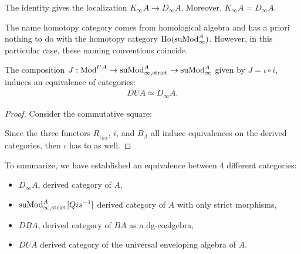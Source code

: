\documentclass[../thesis.tex]{subfiles}
\begin{document}
            \begin{corollary}
                The identity gives the localization $K_\infty A \to D_\infty A$. Moreover, $K_\infty A = D_\infty A$.
            \end{corollary}

            \begin{remark}
                The name homotopy category comes from homological algebra and has a priori nothing to do with the homotopy category $\tt{Ho}(\tt{suMod}_\infty^A)$. However, in this particular case, these naming conventions coincide.
            \end{remark}

            \begin{lemma}\label{lem: universal-enveloping-is-derived}
                The composition $J : \tt{Mod}^{UA} \to \tt{suMod}_{\infty, \tt{strict}}^A \to \tt{suMod}_\infty^A$ given by $J = \iota \circ i$, induces an equivalence of categories:
                \begin{align*}
                    DUA \simeq D_\infty A.
                \end{align*}
            \end{lemma}

            \begin{proof}
                Consider the commutative square:
                \begin{center}
                \end{center}

                Since the three functors $R_{\iota_{BA}}$, $i$, and $B_A$ all induce equivalences on the derived categories, then $\iota$ has to as well.
            \end{proof}

            To summarize, we have established an equivalence between 4 different categories:
            \begin{itemize}
                \item $D_\infty A$, derived category of $A$,
                \item $\tt{suMod}_{\infty, \tt{strict}}^A[Qis^{-1}]$ derived category of $A$ with only strict morphisms,
                \item $DBA$, derived category of $BA$ as a dg-coalgebra,
                \item $DUA$ derived category of the universal enveloping algebra of $A$.
            \end{itemize}
\end{document}
